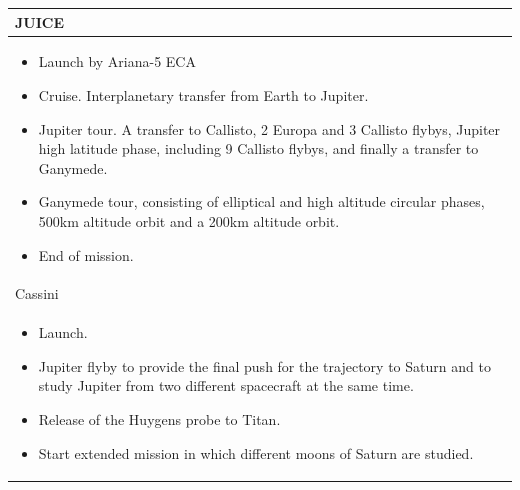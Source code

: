 \begin{longtable}{p{\textwidth}}
  JUICE \\* \midrule

  \begin{itemize}
  \item Launch by Ariana-5 ECA
  \item Cruise. Interplanetary transfer from Earth to Jupiter.
  \item Jupiter tour. A transfer to Callisto, 2 Europa and 3 Callisto
    flybys, Jupiter high latitude phase, including 9 Callisto flybys,
    and finally a transfer to Ganymede.
  \item Ganymede tour, consisting of elliptical and high altitude
    circular phases, 500km altitude orbit and a 200km altitude orbit.
  \item End of mission.
  \end{itemize} \\

  Cassini \\* \midrule

  \begin{itemize}
  \item Launch.
  \item Jupiter flyby to provide the final push for the trajectory to
    Saturn and to study Jupiter from two different spacecraft at the
    same time.
  \item Release of the Huygens probe to Titan.
  \item Start extended mission in which different moons of Saturn are
    studied.
  \end{itemize} \\ \bottomrule
\end{longtable}

